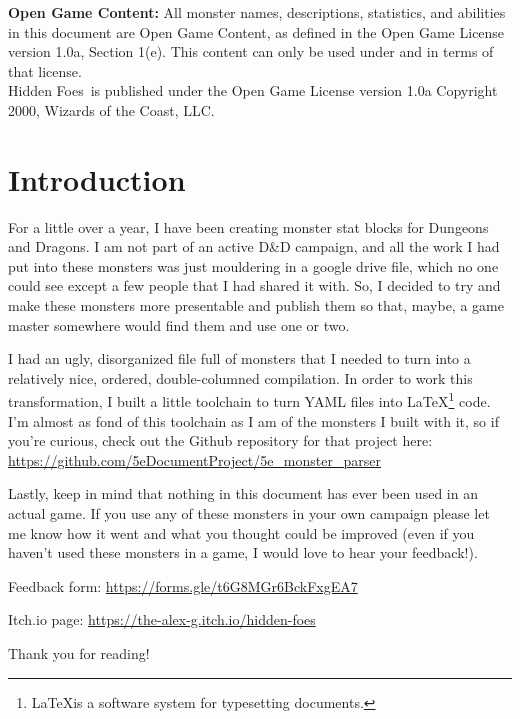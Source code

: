 \documentclass[letterpaper, 12pt, twocolumn]{article}
\title{\projecttitle}
\author{Alex Gestwicki}
\def\projecttitle{Hidden Foes}
\begin{document}
\maketitle
\RaggedRight
\clearpage
\textbf{Open Game Content:} All monster names, descriptions, statistics, and abilities in this document are Open Game Content, as
defined in the Open Game License version 1.0a, Section 1(e). This content can only be used under and in terms of that license.
\\\bigskip
\projecttitle\ is published under the Open Game License version 1.0a Copyright 2000, Wizards of the Coast, LLC.
\newpage
\tableofcontents
\clearpage
\section*{Introduction}
For a little over a year, I have been creating monster stat blocks for Dungeons and Dragons. I am not part of an active D\&D campaign,
and all the work I had put into these monsters was just mouldering in a google drive file, which no one could see except a few people
that I had shared it with. So, I decided to try and make these monsters more presentable and publish them so that, maybe, a 
game master somewhere would find them and use one or two.

I had an ugly, disorganized file full of monsters that I needed to turn into a relatively nice, ordered, double-columned compilation.
In order to work this transformation, I built a little toolchain to turn YAML files into \LaTeX\footnote{\LaTeX is a software system
for typesetting documents.} code. I'm almost as fond of this toolchain as I am of the monsters I built with it, so if you're curious,
check out the Github repository for that project here: \url{https://github.com/5eDocumentProject/5e_monster_parser}

Lastly, keep in mind that nothing in this document has ever been used in an actual game. If you use any of these monsters in your own
campaign please let me know how it went and what you thought could be improved (even if you haven't used these monsters in a game, I
would love to hear your feedback!).

Feedback form: \url{https://forms.gle/t6G8MGr6BckFxgEA7}

Itch.io page: \url{https://the-alex-g.itch.io/hidden-foes}

\bigskip
Thank you for reading!
\clearpage


\clearpage
\end{document}
